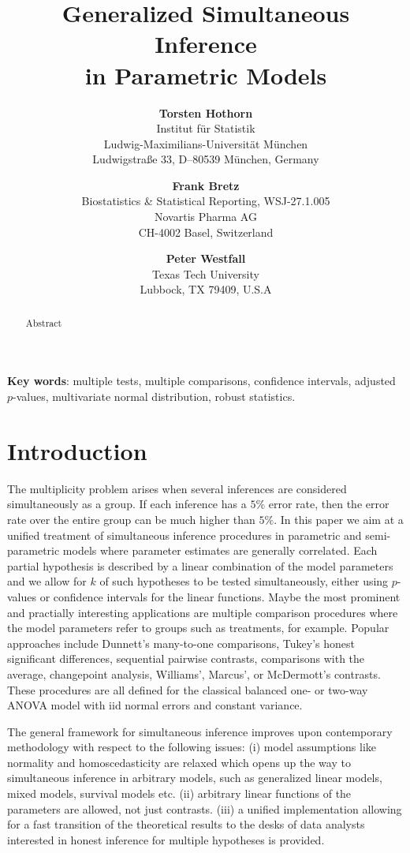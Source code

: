 \documentclass[12pt]{article}
\title{Generalized Simultaneous Inference \\ in Parametric Models}
\author{\textbf{Torsten Hothorn} \\
Institut f{\"u}r Statistik \\
Ludwig-Maximilians-Universit{\"a}t M{\"u}nchen \\
Ludwigstra{\ss}e 33, D--80539 M{\"u}nchen, Germany\\
\and \textbf{Frank Bretz} \\
Biostatistics \& Statistical Reporting, WSJ-27.1.005\\
Novartis Pharma AG \\
CH-4002 Basel, Switzerland \\
\and \textbf{Peter Westfall} \\
Texas Tech University \\
Lubbock, TX 79409, U.S.A}
\begin{document}
\maketitle

\begin{abstract}
Abstract
\end{abstract}

\textbf{Key words}: multiple tests, multiple comparisons, confidence intervals,
adjusted $p$-values, multivariate normal distribution, robust statistics.

\newpage

\section{Introduction}


The multiplicity problem arises when several inferences are considered
simultaneously as a group.  If each inference has a $5\%$ error rate,   
then the error rate over the entire group can be much higher than $5\%$.
In this paper we aim at a unified treatment of simultaneous
inference procedures in parametric and semi-parametric
models where parameter estimates are generally correlated.
Each partial hypothesis is described by a linear
combination of the model parameters and we allow
for $k$ of such hypotheses to be tested simultaneously,
either using $p$-values or confidence intervals
for the linear functions. Maybe the most prominent
and practially interesting applications are multiple
comparison procedures where the model parameters
refer to groups such as treatments, for example.
Popular approaches include Dunnett's many-to-one comparisons,
Tukey's honest significant differences, sequential pairwise contrasts, 
comparisons with the average, changepoint analysis, Williams', 
Marcus', or McDermott's contrasts. These procedures are
all defined for the classical balanced one- or two-way ANOVA model
with iid normal errors and constant variance.

The general framework for simultaneous inference improves
upon contemporary methodology with respect to the following
issues: (i) model assumptions like normality and homoscedasticity
are relaxed which opens up the way to simultaneous inference
in arbitrary models, such as generalized linear models, mixed models,
survival models etc. (ii) arbitrary linear functions of the
parameters are allowed, not just contrasts. (iii)
a unified implementation allowing for a fast transition of the
theoretical results to the desks of data analysts interested
in honest inference for multiple hypotheses is provided.
\end{document}
